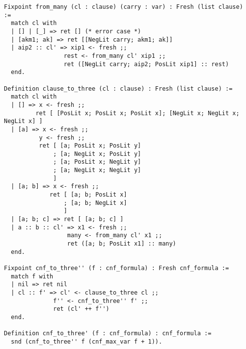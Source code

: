 \documentclass{article}
\begin{document}
\begin{samepage}
  \begin{verbatim}
Fixpoint from_many (cl : clause) (carry : var) : Fresh (list clause) :=
  match cl with
  | [] | [_] => ret [] (* error case *)
  | [akm1; ak] => ret [[NegLit carry; akm1; ak]]
  | aip2 :: cl' => xip1 <- fresh ;;
                 rest <- from_many cl' xip1 ;;
                 ret ([NegLit carry; aip2; PosLit xip1] :: rest)
  end.

Definition clause_to_three (cl : clause) : Fresh (list clause) :=
  match cl with
  | [] => x <- fresh ;;
         ret [ [PosLit x; PosLit x; PosLit x]; [NegLit x; NegLit x; NegLit x] ]
  | [a] => x <- fresh ;;
          y <- fresh ;;
          ret [ [a; PosLit x; PosLit y]
              ; [a; NegLit x; PosLit y]
              ; [a; PosLit x; NegLit y]
              ; [a; NegLit x; NegLit y]
              ]
  | [a; b] => x <- fresh ;;
             ret [ [a; b; PosLit x]
                 ; [a; b; NegLit x]
                 ]
  | [a; b; c] => ret [ [a; b; c] ]
  | a :: b :: cl' => x1 <- fresh ;;
                  many <- from_many cl' x1 ;;
                  ret ([a; b; PosLit x1] :: many)
  end.

Fixpoint cnf_to_three'' (f : cnf_formula) : Fresh cnf_formula :=
  match f with
  | nil => ret nil
  | cl :: f' => cl' <- clause_to_three cl ;;
              f'' <- cnf_to_three'' f' ;;
              ret (cl' ++ f'')
  end.

Definition cnf_to_three' (f : cnf_formula) : cnf_formula :=
  snd (cnf_to_three'' f (cnf_max_var f + 1)).
  \end{verbatim}
\end{samepage}
\end{document}
